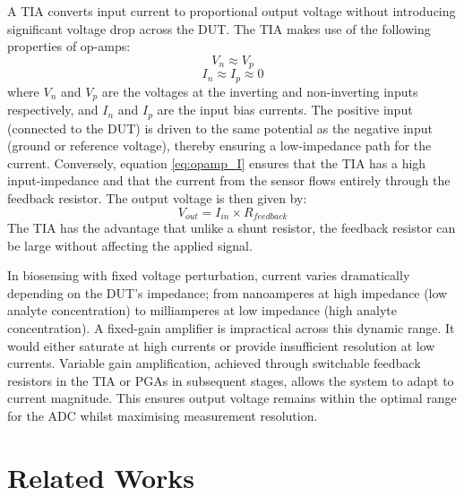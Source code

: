 A \ac{TIA} converts input current to proportional output voltage without introducing significant voltage drop across the \ac{DUT}. The \ac{TIA} makes use of the following properties of op-amps:
\begin{equation}
    V_n \approx V_p
    \label{eq:opamp_V}
\end{equation}
\begin{equation}
    I_n \approx I_p \approx 0
    \label{eq:opamp_I}
\end{equation}
where $V_n$ and $V_p$ are the voltages at the inverting and non-inverting inputs respectively, and $I_n$ and $I_p$ are the input bias currents. The positive input (connected to the \ac{DUT}) is driven to the same potential as the negative input (ground or reference voltage), thereby ensuring a low-impedance path for the current. Conversely, equation \ref{eq:opamp_I} ensures that the TIA has a high input-impedance and that the current from the sensor flows entirely through the feedback resistor. The output voltage is then given by:
\begin{equation}
    V_{out}=I_{in} \times R_{feedback}
    \label{eq:tia_gain}
\end{equation}
The \ac{TIA} has the advantage that unlike a shunt resistor, the feedback resistor can be large without affecting the applied signal.

In biosensing with fixed voltage perturbation, current varies dramatically depending on the \ac{DUT}'s impedance; from nanoamperes at high impedance (low analyte concentration) to milliamperes at low impedance (high analyte concentration). A fixed-gain amplifier is impractical across this dynamic range. It would either saturate at high currents or provide insufficient resolution at low currents. Variable gain amplification, achieved through switchable feedback resistors in the \ac{TIA} or \acp{PGA} in subsequent stages, allows the system to adapt to current magnitude. This ensures output voltage remains within the optimal range for the \ac{ADC} whilst maximising measurement resolution.

\section{Related Works}

\label{chap:literature_review}